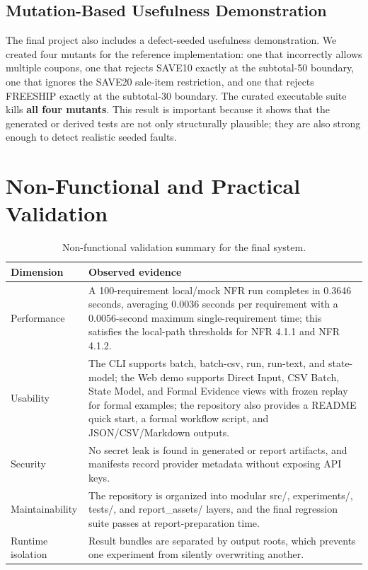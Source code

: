 \documentclass{article}
\renewcommand{\texttt}[1]{{\normalfont #1}}
\begin{document}
\subsection{Mutation-Based Usefulness Demonstration}
The final project also includes a defect-seeded usefulness demonstration. We created four mutants for the reference implementation: one that incorrectly allows multiple coupons, one that rejects \texttt{SAVE10} exactly at the subtotal-50 boundary, one that ignores the \texttt{SAVE20} sale-item restriction, and one that rejects \texttt{FREESHIP} exactly at the subtotal-30 boundary. The curated executable suite kills \textbf{all four mutants}. This result is important because it shows that the generated or derived tests are not only structurally plausible; they are also strong enough to detect realistic seeded faults.

\section{Non-Functional and Practical Validation}
\begin{table}[!htbp]
\centering
\scriptsize
\setlength{\tabcolsep}{3pt}
\caption{Non-functional validation summary for the final system.}
\label{tab:nfr}
\begin{tabular}{p{} p{}}
\toprule
\textbf{Dimension} & \textbf{Observed evidence} \\
\midrule
Performance & A 100-requirement local/mock NFR run completes in 0.3646 seconds, averaging 0.0036 seconds per requirement with a 0.0056-second maximum single-requirement time; this satisfies the local-path thresholds for NFR 4.1.1 and NFR 4.1.2. \\
Usability & The CLI supports \texttt{batch}, \texttt{batch-csv}, \texttt{run}, \texttt{run-text}, and \texttt{state-model}; the Web demo supports Direct Input, CSV Batch, State Model, and Formal Evidence views with frozen replay for formal examples; the repository also provides a README quick start, a formal workflow script, and JSON/CSV/Markdown outputs. \\
Security & No secret leak is found in generated or report artifacts, and manifests record provider metadata without exposing API keys. \\
Maintainability & The repository is organized into modular \texttt{src/}, \texttt{experiments/}, \texttt{tests/}, and \texttt{report\_assets/} layers, and the final regression suite passes at report-preparation time. \\
Runtime isolation & Result bundles are separated by output roots, which prevents one experiment from silently overwriting another. \\
\bottomrule
\end{tabular}
\end{table}
\end{document}
